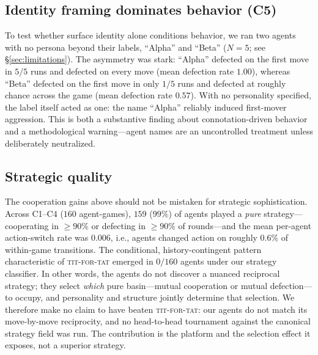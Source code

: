 \subsection{Identity framing dominates behavior (C5)}
\label{sec:results-c5}
To test whether surface identity alone conditions behavior, we ran two agents with no persona beyond their labels, ``Alpha'' and ``Beta'' ($N=5$; see \S\ref{sec:limitations}). The asymmetry was stark: ``Alpha'' defected on the first move in $5/5$ runs and defected on every move (mean defection rate $1.00$), whereas ``Beta'' defected on the first move in only $1/5$ runs and defected at roughly chance across the game (mean defection rate $0.57$). With no personality specified, the label itself acted as one: the name ``Alpha'' reliably induced first-mover aggression. This is both a substantive finding about connotation-driven behavior and a methodological warning---agent names are an uncontrolled treatment unless deliberately neutralized.

\subsection{Strategic quality}
\label{sec:results-quality}
The cooperation gains above should not be mistaken for strategic sophistication. Across C1--C4 ($160$ agent-games), $159$ ($99\%$) of agents played a \emph{pure} strategy---cooperating in $\ge 90\%$ or defecting in $\ge 90\%$ of rounds---and the mean per-agent action-switch rate was $0.006$, i.e., agents changed action on roughly $0.6\%$ of within-game transitions. The conditional, history-contingent pattern characteristic of \textsc{tit-for-tat} emerged in $0/160$ agents under our strategy classifier. In other words, the agents do not discover a nuanced reciprocal strategy; they select \emph{which} pure basin---mutual cooperation or mutual defection---to occupy, and personality and structure jointly determine that selection. We therefore make no claim to have beaten \textsc{tit-for-tat}: our agents do not match its move-by-move reciprocity, and no head-to-head tournament against the canonical strategy field was run. The contribution is the platform and the selection effect it exposes, not a superior strategy.

